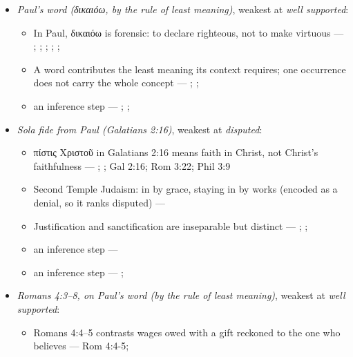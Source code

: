 \documentclass[11pt]{article}
\begin{document}
\begin{itemize}
\begin{itemize}
\end{itemize}
\item \emph{Paul's word (δικαιόω, by the rule of least meaning)}, weakest at \emph{well supported}:
\begin{itemize}
\item In Paul, δικαιόω is forensic: to declare righteous, not to make virtuous --- \cite[s.v. δικαιόω]{bauer-danker-lexicon-2000}; \cite{morris-apostolic-preaching-1965}; \cite[p. 80]{moo-romans-1996}; \cite{irons-righteousness-of-god-2015}; \cite{wright-justification-2009}; \cite[ad loc. Rom 3:24]{fitzmyer-romans-1993}
\item A word contributes the least meaning its context requires; one occurrence does not carry the whole concept --- \cite{silva-biblical-words-1994}; \cite{joos-semantic-axiom-1972}; \cite{barr-semantics-2004}
\item an inference step --- \cite{silva-biblical-words-1994}; \cite[p. 80]{moo-romans-1996}; \cite{barr-semantics-2004}
\end{itemize}
\item \emph{Sola fide from Paul (Galatians 2:16)}, weakest at \emph{disputed}:
\begin{itemize}
\item πίστις Χριστοῦ in Galatians 2:16 means faith in Christ, not Christ's faithfulness --- \cite{dunn-once-more-pistis-christou-1991}; \cite{matlock-detheologizing-2000}; Gal 2:16; Rom 3:22; Phil 3:9
\item Second Temple Judaism: in by grace, staying in by works (encoded as a denial, so it ranks disputed) --- \cite{sanders-paul-palestinian-judaism-1977}
\item Justification and sanctification are inseparable but distinct --- \cite[XIII.1]{westminster-confession-1647}; \cite[XI.1]{westminster-confession-1647}; \cite[III.xi.6]{calvin-institutes-1960}
\item an inference step --- \cite[Trent, Session VI (1547), canon 9]{tanner-decrees-1990}
\item an inference step --- \cite{gathercole-where-boasting-2002}; \cite{carson-variegated-nomism-1-2001}
\end{itemize}
\item \emph{Romans 4:3–8, on Paul's word (by the rule of least meaning)}, weakest at \emph{well supported}:
\begin{itemize}
\item Romans 4:4–5 contrasts wages owed with a gift reckoned to the one who believes --- Rom 4:4-5; \cite[III.xi.18]{calvin-institutes-1960}

\end{itemize}
\end{itemize}
\end{document}
